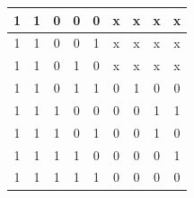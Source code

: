 \documentclass[a4paper,14pt]{article}
\begin{document}
\begin{table}[H]
\begin{center}
\begin{tabular}{|c|c|c|c|c|c|c|c|c|}
		1  & 1  & 0  & 0  & 0  & x & x & x & x  \\ \hline
		1  & 1  & 0  & 0  & 1  & x & x & x & x  \\ \hline
		1  & 1  & 0  & 1  & 0  & x & x & x & x  \\ \hline
		1  & 1  & 0  & 1  & 1  & 0 & 1 & 0 & 0  \\ \hline
		1  & 1  & 1  & 0  & 0  & 0 & 0 & 1 & 1  \\ \hline
		1  & 1  & 1  & 0  & 1  & 0 & 0 & 1 & 0  \\ \hline
		1  & 1  & 1  & 1  & 0  & 0 & 0 & 0 & 1  \\ \hline
		1  & 1  & 1  & 1  & 1  & 0 & 0 & 0 & 0  \\ \hline
	\end{tabular}
\end{center}
\end{table}

\end{document}
